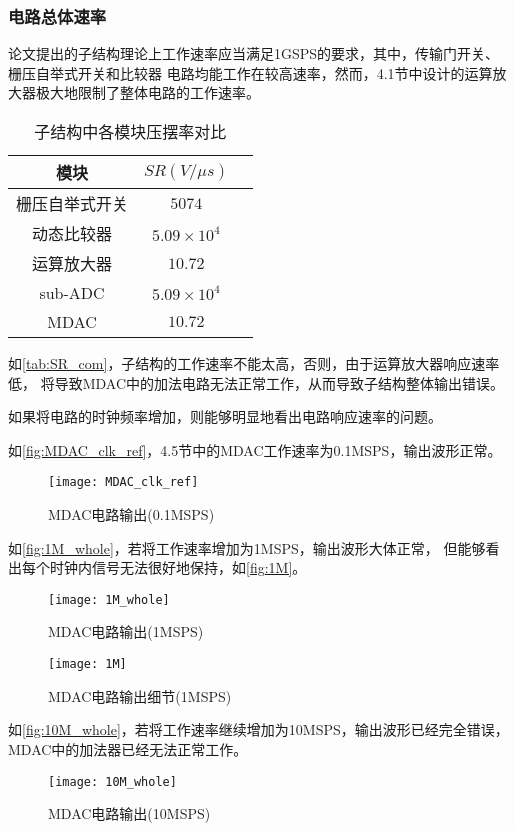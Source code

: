     \subsubsection{电路总体速率}
    论文提出的子结构理论上工作速率应当满足1GSPS的要求，其中，传输门开关、栅压自举式开关和比较器
    电路均能工作在较高速率，然而，4.1节中设计的运算放大器极大地限制了整体电路的工作速率。
    \begin{table}[ht]
        \centering
        \caption{\label{tab:SR_com}子结构中各模块压摆率对比}
        \begin{tabular}{|c|c|c|}
            \hline
            模块 & $SR(V/\mu s)$ \\ \hline
            栅压自举式开关 & $5074$ \\ \hline
            动态比较器 & $5.09\times 10^4$ \\ \hline
            运算放大器 & $10.72$ \\ \hline
            sub-ADC & $5.09\times 10^4$ \\ \hline
            MDAC & $10.72$ \\ \hline
        \end{tabular}
    \end{table}
    \par 如\autoref{tab:SR_com}，子结构的工作速率不能太高，否则，由于运算放大器响应速率低，
    将导致MDAC中的加法电路无法正常工作，从而导致子结构整体输出错误。
    \par 如果将电路的时钟频率增加，则能够明显地看出电路响应速率的问题。
    \par 如\autoref{fig:MDAC_clk_ref}，4.5节中的MDAC工作速率为0.1MSPS，输出波形正常。
    \begin{figure}[H]
        \centering
        \texttt{[image: MDAC\_clk\_ref]}
        \caption{\label{fig:MDAC_clk_ref}MDAC电路输出(0.1MSPS)}
    \end{figure}
    \par 如\autoref{fig:1M_whole}，若将工作速率增加为1MSPS，输出波形大体正常，
    但能够看出每个时钟内信号无法很好地保持，如\autoref{fig:1M}。
    \begin{figure}[H]
        \centering
        \texttt{[image: 1M\_whole]}
        \caption{\label{fig:1M_whole}MDAC电路输出(1MSPS)}
    \end{figure}
    \begin{figure}[H]
        \centering
        \texttt{[image: 1M]}
        \caption{\label{fig:1M}MDAC电路输出细节(1MSPS)}
    \end{figure}
    \par 如\autoref{fig:10M_whole}，若将工作速率继续增加为10MSPS，输出波形已经完全错误，
    MDAC中的加法器已经无法正常工作。
    \begin{figure}[H]
        \centering
        \texttt{[image: 10M\_whole]}
        \caption{\label{fig:10M_whole}MDAC电路输出(10MSPS)}
    \end{figure}

